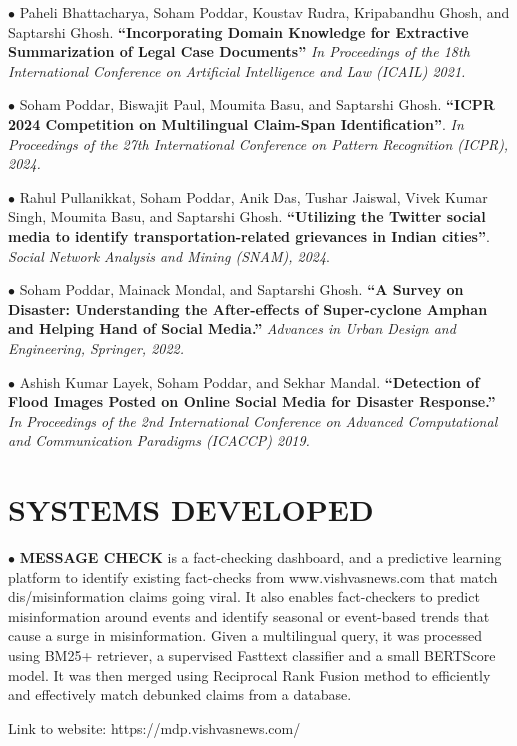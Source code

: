 \documentclass[paper=a4,fontsize=10pt]{scrartcl} %
\newcommand{\sepspace}{\vspace*{0.6em}}		%
\newcommand{\NewPart}[1]{\section*{\uppercase{#1}}}
\begin{document}
{    \noindent $\bullet$ Paheli Bhattacharya, Soham Poddar, Koustav Rudra, Kripabandhu Ghosh, and Saptarshi Ghosh. \textbf{``Incorporating Domain Knowledge for Extractive Summarization of Legal Case Documents''} \textit{In Proceedings of the 18th International Conference on Artificial Intelligence and Law (ICAIL) 2021.} \sepspace

    
    \noindent $\bullet$ Soham Poddar, Biswajit Paul, Moumita Basu, and Saptarshi Ghosh. \textbf{``ICPR 2024 Competition on Multilingual Claim-Span Identification''}.  
    \textit{In Proceedings of the 27th International Conference on Pattern Recognition (ICPR), 2024.} \sepspace

    
    \noindent $\bullet$ Rahul Pullanikkat, Soham Poddar, Anik Das, Tushar Jaiswal, Vivek Kumar Singh, Moumita Basu, and Saptarshi Ghosh. \textbf{``Utilizing the Twitter social media to identify transportation-related grievances in Indian cities''}. \textit{Social Network Analysis and Mining (SNAM), 2024}. 
    \vspace{1.5mm}
    
    \noindent $\bullet$  Soham Poddar, Mainack Mondal, and Saptarshi Ghosh. \textbf{``A Survey on Disaster: Understanding the After-effects of Super-cyclone Amphan and Helping Hand of Social Media.''} \textit{Advances in Urban Design and Engineering, Springer, 2022.} 
    \vspace{1.5mm}
    
    
    \noindent $\bullet$ Ashish Kumar Layek, Soham Poddar, and Sekhar Mandal. \textbf{``Detection of Flood Images Posted on Online Social Media for Disaster Response.''} \textit{In Proceedings of the 2nd International Conference on Advanced Computational and Communication Paradigms (ICACCP)  2019.} 
}
\vspace*{-2mm}






\NewPart{Systems Developed}{}

\vspace*{-1mm}
{
\small
    \noindent $\bullet$ \textbf{MESSAGE CHECK} is a fact-checking dashboard, and a predictive learning platform to identify existing fact-checks from www.vishvasnews.com that match dis/misinformation claims going viral. It also enables fact-checkers to predict misinformation around events and identify seasonal or event-based trends that cause a surge in misinformation. 
    Given a multilingual query, it was processed using BM25+ retriever, a supervised Fasttext classifier and a small BERTScore model. It was then merged using Reciprocal Rank Fusion method to efficiently and effectively match debunked claims from a database.

    \noindent Link to website: https://mdp.vishvasnews.com/ 
}
\vspace*{-2mm}
\end{document}
